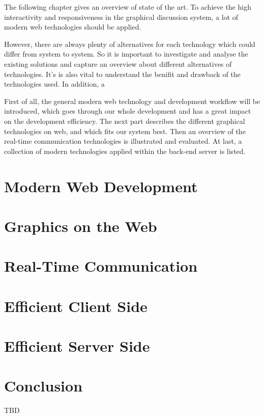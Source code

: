The following chapter gives an overview of state of the art. To achieve the high interactivity and responsiveness in the graphical discussion system, a lot of modern web technologies should be applied.

However, there are always plenty of alternatives for each technology which could differ from system to system. So it is important to investigate and analyse the existing solutions and capture an overview about different alternatives of technologies. It's is also vital to understand the benifit and drawback of the technologies used. In addition, a

First of all, the general modern web technology and development workflow will be introduced, which goes through our whole development and has a great impact on the development \asdasd{} efficiency. The next part describes the different graphical technologies on web, and which fits our system best. Then an overview of the real-time communication technologies is illustrated and evaluated. At last, a collection of modern technologies applied within the back-end server is listed.

\section{Modern Web Development}

\section{Graphics on the Web}
 \label{graphics-section}
\section{Real-Time Communication}

\section{Efficient Client Side}

\section{Efficient Server Side}



\section{Conclusion}

TBD